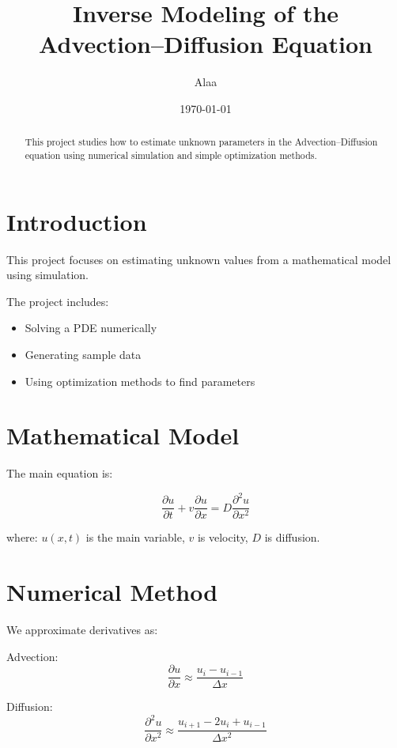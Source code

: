 \documentclass[11pt,a4paper]{article}
\title{Inverse Modeling of the Advection--Diffusion Equation}
\author{Alaa}
\date{\today}
\begin{document}
\maketitle

\begin{abstract}
This project studies how to estimate unknown parameters in the Advection--Diffusion equation using numerical simulation and simple optimization methods.
\end{abstract}

\section{Introduction}

This project focuses on estimating unknown values from a mathematical model using simulation.

The project includes:
\begin{itemize}
\item Solving a PDE numerically
\item Generating sample data
\item Using optimization methods to find parameters
\end{itemize}

\section{Mathematical Model}

The main equation is:

\begin{equation}
\frac{\partial u}{\partial t}
+
v \frac{\partial u}{\partial x}
=
D \frac{\partial^2 u}{\partial x^2}
\end{equation}

where:
$u(x,t)$ is the main variable,  
$v$ is velocity,  
$D$ is diffusion.

\section{Numerical Method}

We approximate derivatives as:

Advection:
\begin{equation}
\frac{\partial u}{\partial x} \approx \frac{u_i - u_{i-1}}{\Delta x}
\end{equation}

Diffusion:
\begin{equation}
\frac{\partial^2 u}{\partial x^2} \approx \frac{u_{i+1} - 2u_i + u_{i-1}}{\Delta x^2}
\end{equation}
\end{document}
